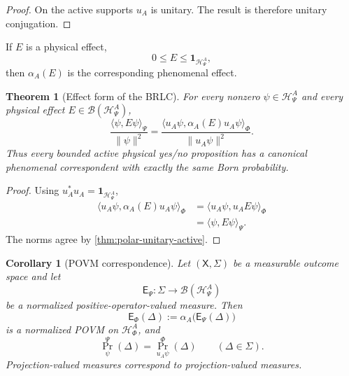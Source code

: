 \documentclass[11pt,reqno]{scrartcl}
\newcommand{\idop}{\mathbf 1}
\newcommand{\polA}{u_A}
\newcommand{\inner}[2]{\langle #1,#2\rangle}
\newcommand{\actHP}{\mathscr H_{\Psi}^{A}}
\newcommand{\actHF}{\mathscr H_{\Phi}^{A}}
\newcommand{\alphaA}{\alpha_{A}}
\theoremstyle{plain}
\newtheorem{theorem}{Theorem}[section]
\newtheorem{corollary}[corollary]{Corollary}
\theoremstyle{definition}
\theoremstyle{remark}
\begin{document}
\begin{proof}
On the active supports \(\polA\) is unitary.  The result is therefore unitary
conjugation.
\end{proof}

If \(E\) is a physical effect,
\begin{equation}
  0\le E\le\idop_{\actHP},
\end{equation}
then \(\alphaA(E)\) is the corresponding phenomenal effect.

\begin{theorem}[Effect form of the BRLC]
\label{thm:BRLC-effect-form}
For every nonzero \(\psi\in\actHP\) and every physical effect
\(E\in\mathcal B(\actHP)\),
\begin{equation}
  \boxed{
  \frac{\inner{\psi}{E\psi}_{\Psi}}{\|\psi\|^2}
  =
  \frac{\inner{\polA\psi}{\alphaA(E)\polA\psi}_{\Phi}}
       {\|\polA\psi\|^2}.}
  \label{eq:BRLC-effect-probability}
\end{equation}
Thus every bounded active physical yes/no proposition has a canonical
phenomenal correspondent with exactly the same Born probability.
\end{theorem}

\begin{proof}
Using \(\polA^*\polA=\idop_{\actHP}\),
\begin{align}
  \inner{\polA\psi}{\alphaA(E)\polA\psi}_{\Phi}
  &=\inner{\polA\psi}{\polA E\psi}_{\Phi}\\
  &=\inner{\psi}{E\psi}_{\Psi}.
\end{align}
The norms agree by \cref{thm:polar-unitary-active}.
\end{proof}

\begin{corollary}[POVM correspondence]
\label{cor:BRLC-POVM}
Let \((\mathsf X,\Sigma)\) be a measurable outcome space and let
\begin{equation}
  \mathsf E_{\Psi}:\Sigma\to\mathcal B(\actHP)
\end{equation}
be a normalized positive-operator-valued measure.  Then
\begin{equation}
  \mathsf E_{\Phi}(\Delta)
  :=\alphaA\bigl(\mathsf E_{\Psi}(\Delta)\bigr)
  \label{eq:phenomenal-POVM-definition}
\end{equation}
is a normalized POVM on \(\actHF\), and
\begin{equation}
  \Pr_{\psi}^{\Psi}(\Delta)
  =\Pr_{\polA\psi}^{\Phi}(\Delta)
  \qquad
  (\Delta\in\Sigma).
  \label{eq:POVM-distribution-equality}
\end{equation}
Projection-valued measures correspond to projection-valued measures.
\end{corollary}
\end{document}
